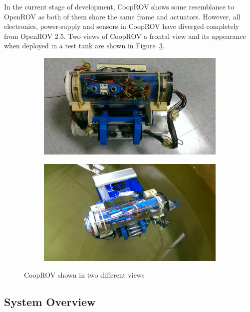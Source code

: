 \documentclass {udthesis}
\begin{document}
In the current stage of development, CoopROV shows some resemblance to OpenROV as both of them share the same frame and actuators. However, all electronics, power-supply and sensors in CoopROV have diverged completely from OpenROV 2.5. Two views of CoopROV a frontal view and its appearance when deployed in a test tank are shown in Figure~\ref{fig:cooprov}.
%
\begin{figure}
  \centering
  \begin{subfigure}[]{0.45\textwidth}
      \includegraphics[width=\textwidth]{cooprov_front}
      \label{fig:cooprov_front}
  \end{subfigure}
  \begin{subfigure}[]{0.45\textwidth}
      \includegraphics[width=\textwidth]{cooprov_top}
      \label{subfig:cooprov_top}
  \end{subfigure}
  \caption[CoopROV]{CoopROV shown in two different views}
  \label{fig:cooprov}
\end{figure} 

\subsection{System Overview}
\end{document}
